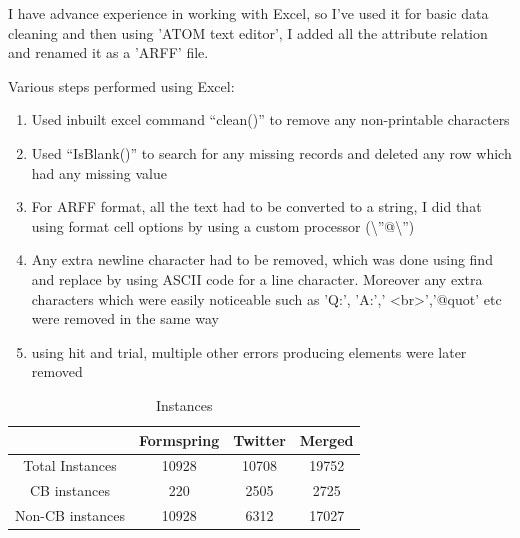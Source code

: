 \documentclass[10pt,conference]{IEEEtran}
\begin{document}
I have advance experience in working with Excel, so I’ve used it for basic data cleaning and then using 'ATOM text editor', I added all the attribute relation and renamed it as a 'ARFF' file.

Various steps performed using Excel:

\begin{enumerate}
    \item Used inbuilt excel command “clean()” to remove any non-printable characters
    \item Used “IsBlank()” to search for any missing records and deleted any row which had any missing value
    \item For ARFF format, all the text had to be converted to a string, I did that using format cell options by using a custom processor (\textbackslash{}\textquotedblright{}@\textbackslash{}\textquotedblright{})
    \item Any extra newline character had to be removed, which was done using find and replace by using ASCII code for a line character. Moreover any extra characters which were easily noticeable such as 'Q:', 'A:',' \textless br\textgreater ','@quot' etc were removed in the same way
    \item using hit and trial, multiple other errors producing elements were later removed
    

\end{enumerate}

\begin{table}[htbp]
    \caption{Instances}
    \centering
    \begin{tabular}{|c|c|c|c|}
        \hline
         & \textbf{Formspring} & \textbf{Twitter} & \textbf{Merged} \\
         \hline
        Total Instances & 10928 & 10708 & 19752 \\
        \hline
        CB instances & 220 & 2505 & 2725 \\
        \hline
        Non-CB instances & 10928 & 6312 & 17027\\ 
        \hline
    \end{tabular}
    \label{tab:my_label}
\end{table}
\end{document}
